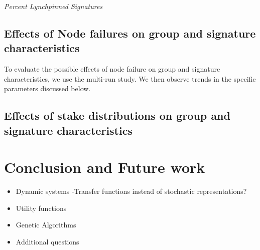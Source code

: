 \documentclass[conference]{IEEEtran}
\begin{document}
\textit{Percent Lynchpinned Signatures}

\subsection{Effects of Node failures on group and signature characteristics}
To evaluate the possible effects of node failure on group and signature characteristics, we use the
multi-run study. We then observe trends in the specific parameters discussed below.


\subsection{Effects of stake distributions on group and signature characteristics}


\section{Conclusion and Future work}
\begin{itemize}
\item Dynamic systems -Transfer functions instead of stochastic representations?
\item Utility functions
\item Genetic Algorithms
\item Additional questions
\end{itemize}



\end{document}
